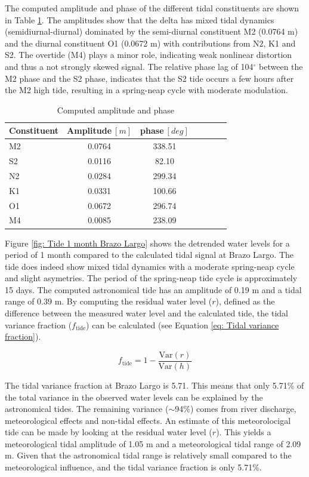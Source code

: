 The computed amplitude and phase of the different tidal constituents are shown in Table \ref{tab: computed tidal constituents}. The amplitudes show that the delta has mixed tidal dynamics (semidiurnal-diurnal) dominated by the semi-diurnal constituent M2 (0.0764 m) and the diurnal constituent O1 (0.0672 m)  with contributions from N2, K1 and S2. The overtide (M4) plays a minor role, indicating weak nonlinear distortion and thus a not strongly skewed signal. The relative phase lag of 104$^\circ$ between the M2 phase and the S2 phase, indicates that the S2 tide occurs a few hours after the M2 high tide, resulting in a spring-neap cycle with moderate modulation.

\begin{table}[H]
\centering
\setlength{\tabcolsep}{8pt} 
\caption{Computed amplitude and phase}
\label{tab: computed tidal constituents}
\begin{tabular}{lcccccc}
\hline
Constituent & Amplitude$~[m]$ & phase$~[deg]$ \\
\hline
M2 & 0.0764 & 338.51 \\
S2 & 0.0116 & 82.10 \\
N2 & 0.0284 & 299.34 \\
K1 & 0.0331 & 100.66  \\
O1 & 0.0672 & 296.74 \\
M4 & 0.0085 & 238.09  \\
\hline
\end{tabular}
\end{table}

Figure \ref{fig: Tide 1 month Brazo Largo} shows the detrended water levels for a period of 1 month compared to the calculated tidal signal at Brazo Largo. The tide does indeed show mixed tidal dynamics with a moderate spring-neap cycle and slight asymetries. The period of the spring-neap tide cycle is approximately 15 days. The computed astronomical tide has an amplitude of 0.19 m and a tidal range of 0.39 m. By computing the residual water level ($r$), defined as the difference between the measured water level and the calculated tide, the tidal variance fraction ($f_\text{tide}$) can be calculated (see Equation \ref{eq: Tidal variance fraction}).

\begin{equation}
    f_{\text{tide}} = 1 - \frac{\mathrm{Var}(r)}{\mathrm{Var}(h)}
    \label{eq: Tidal variance fraction}
\end{equation}

The tidal variance fraction at Brazo Largo is 5.71. This means that only 5.71\% of the total variance in the observed water levels can be explained by the astronomical tides. The remaining variance ($\sim$94\%) comes from river discharge, meteorological effects and non-tidal effects. An estimate of this meteorolocigal tide can be made by looking at the residual water level ($r$). This yields a meteorological tidal amplitude of 1.05 m and a meteorological tidal range of 2.09 m. Given that the astronomical tidal range is relatively small compared to the meteorological influence, and the tidal variance fraction is only 5.71\%.


